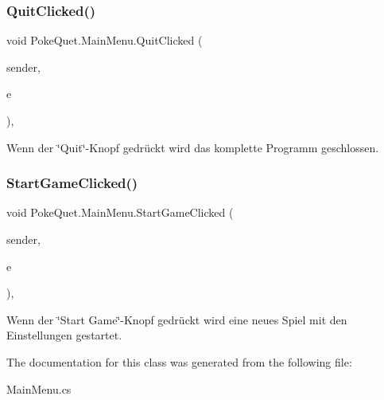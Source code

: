 \subsubsection{\texorpdfstring{Quit\+Clicked()}{QuitClicked()}}
{\footnotesize\ttfamily void Poke\+Quet.\+Main\+Menu.\+Quit\+Clicked (\begin{DoxyParamCaption}\item[{object}]{sender,  }\item[{Event\+Args}]{e }\end{DoxyParamCaption})\hspace{0.3cm}{\ttfamily [inline]}, {\ttfamily [protected]}}



Wenn der \char`\"{}\+Quit\char`\"{}-\/\+Knopf gedrückt wird das komplette Programm geschlossen. 

\mbox{\label{class_poke_quet_1_1_main_menu_a66d3fc7a5c2b1b41fef3c3a1ee268c01}} 
\subsubsection{\texorpdfstring{Start\+Game\+Clicked()}{StartGameClicked()}}
{\footnotesize\ttfamily void Poke\+Quet.\+Main\+Menu.\+Start\+Game\+Clicked (\begin{DoxyParamCaption}\item[{object}]{sender,  }\item[{Event\+Args}]{e }\end{DoxyParamCaption})\hspace{0.3cm}{\ttfamily [inline]}, {\ttfamily [protected]}}



Wenn der \char`\"{}\+Start Game\char`\"{}-\/\+Knopf gedrückt wird eine neues Spiel mit den Einstellungen gestartet. 



The documentation for this class was generated from the following file\+:\begin{DoxyCompactItemize}
\item 
Main\+Menu.\+cs\end{DoxyCompactItemize}
